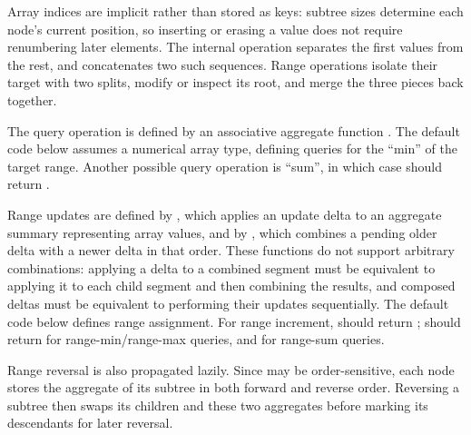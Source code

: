 Array indices are implicit rather than stored as keys: subtree sizes determine each node's current position, so inserting or erasing a value does not require renumbering later elements. The internal  operation separates the first  values from the rest, and  concatenates two such sequences. Range operations isolate their target with two splits, modify or inspect its root, and merge the three pieces back together.

The query operation is defined by an associative aggregate function . The default code below assumes a numerical array type, defining queries for the ``min'' of the target range. Another possible query operation is ``sum'', in which case  should return .

Range updates are defined by , which applies an update delta  to an aggregate summary  representing  array values, and by , which combines a pending older delta with a newer delta in that order. These functions do not support arbitrary combinations: applying a delta to a combined segment must be equivalent to applying it to each child segment and then combining the results, and composed deltas must be equivalent to performing their updates sequentially. The default code below defines range assignment. For range increment,  should return ;  should return  for range-min/range-max queries, and  for range-sum queries.

Range reversal is also propagated lazily. Since  may be order-sensitive, each node stores the aggregate of its subtree in both forward and reverse order. Reversing a subtree then swaps its children and these two aggregates before marking its descendants for later reversal.

